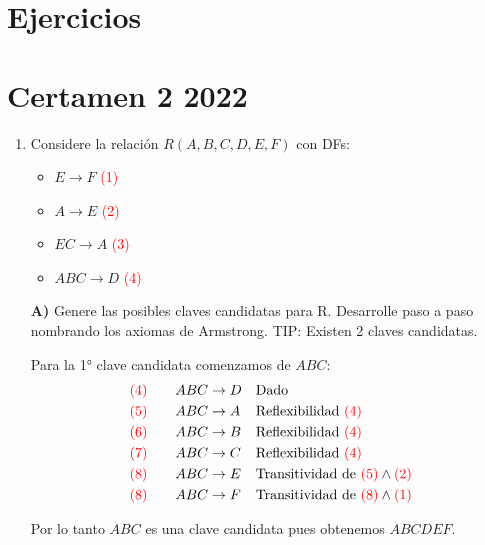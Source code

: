 \documentclass{templateNote}
\begin{document}
\newpage
\section{Ejercicios}

\section*{Certamen 2 2022}

\begin{enumerate}
    \item Considere la relación $R(A,B,C,D,E,F)$ con DFs:
    \begin{itemize}
        \item $E \rightarrow F$ \textcolor{red}{(1)}
        \item $A \rightarrow E$ \textcolor{red}{(2)}
        \item $EC \rightarrow A$ \textcolor{red}{(3)}
        \item $ABC \rightarrow D$ \textcolor{red}{(4)}
    \end{itemize}
    
    \hrulefill

    \textbf{A)} Genere las posibles claves candidatas para R. Desarrolle paso a paso nombrando los axiomas de Armstrong. TIP: Existen 2 claves candidatas.

    Para la 1° clave candidata comenzamos de $ABC$:
    \begin{align*}
        \textcolor{red}{(4)} \qquad ABC &\rightarrow D && \text{Dado} \\
        \textcolor{red}{(5)} \qquad ABC &\rightarrow A && \text{Reflexibilidad } \textcolor{red}{(4)} \\
        \textcolor{red}{(6)} \qquad ABC &\rightarrow B && \text{Reflexibilidad } \textcolor{red}{(4)} \\
        \textcolor{red}{(7)} \qquad ABC &\rightarrow C && \text{Reflexibilidad } \textcolor{red}{(4)} \\
        \textcolor{red}{(8)} \qquad ABC &\rightarrow E && \text{Transitividad de } \textcolor{red}{(5)} \wedge \textcolor{red}{(2)} \\
        \textcolor{red}{(8)} \qquad ABC &\rightarrow F && \text{Transitividad de } \textcolor{red}{(8)} \wedge \textcolor{red}{(1)} \\
    \end{align*}

    Por lo tanto $ABC$ es una clave candidata pues obtenemos $ABCDEF$.
    

\end{enumerate}
\end{document}
